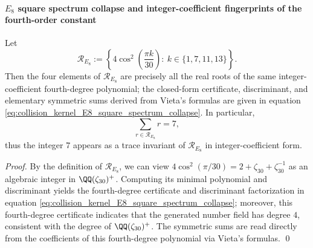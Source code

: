 
\paragraph{\texorpdfstring{$E_8$}{E8} square spectrum collapse and integer-coefficient fingerprints of the fourth-order constant}\label{para:pom-s4-e8-square-spectrum-collapse}

\begin{proposition}\label{prop:pom-e8-square-spectrum-collapse-trace7}
Let
\[
\mathcal R_{E_8}:=\left\{4\cos^2\!\left(\frac{\pi k}{30}\right):\ k\in\{1,7,11,13\}\right\}.
\]
Then the four elements of \(\mathcal R_{E_8}\) are precisely all the real roots of the same integer-coefficient fourth-degree polynomial; the closed-form certificate, discriminant, and elementary symmetric sums derived from Vieta's formulas are given in equation \eqref{eq:collision_kernel_E8_square_spectrum_collapse}.
In particular,
\[
\sum_{r\in\mathcal R_{E_8}}r=7,
\]
thus the integer \(7\) appears as a trace invariant of \(\mathcal R_{E_8}\) in integer-coefficient form.
\end{proposition}
\begin{proof}
By the definition of \(\mathcal R_{E_8}\), we can view \(4\cos^2(\pi/30)=2+\zeta_{30}+\zeta_{30}^{-1}\) as an algebraic integer in \(\QQ(\zeta_{30})^+\).
Computing its minimal polynomial and discriminant yields the fourth-degree certificate and discriminant factorization in equation \eqref{eq:collision_kernel_E8_square_spectrum_collapse}; moreover, this fourth-degree certificate indicates that the generated number field has degree \(4\), consistent with the degree of \(\QQ(\zeta_{30})^+\).
The symmetric sums are read directly from the coefficients of this fourth-degree polynomial via Vieta's formulas. \qed
\end{proof}

